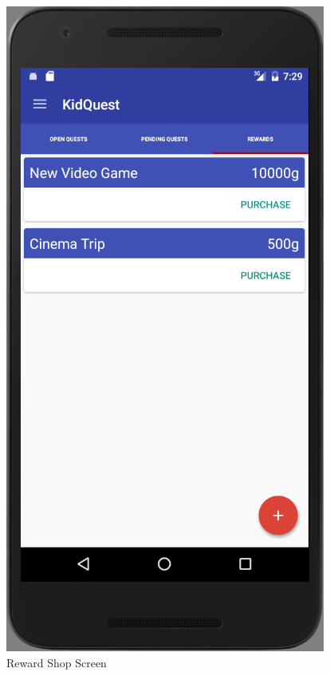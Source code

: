 \begin{figure}[ht]
\begin{minipage}[b]{0.45\linewidth}
    \includegraphics[width=.7\linewidth, frame]{../images/Screenshot/RewardShopScreen.png}
    \caption{Reward Shop Screen} 
    \vspace{4ex}
  \end{minipage} 
\end{figure}

